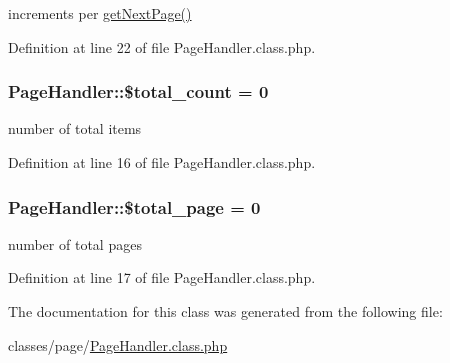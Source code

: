 increments per \hyperlink{classPageHandler_a259d01838d005d854d4cc263ba524de7}{get\+Next\+Page()} 



Definition at line 22 of file Page\+Handler.\+class.\+php.

\hypertarget{classPageHandler_ad0425a5e936db072a17956e4dada6f2b}{
\subsubsection[{\$total\+\_\+count}]{\setlength{\rightskip}{0pt plus 5cm}Page\+Handler\+::\$total\+\_\+count = 0}}\label{classPageHandler_ad0425a5e936db072a17956e4dada6f2b}


number of total items 



Definition at line 16 of file Page\+Handler.\+class.\+php.

\hypertarget{classPageHandler_adfb101b1d69a89c65cbe405e5d2be0ad}{
\subsubsection[{\$total\+\_\+page}]{\setlength{\rightskip}{0pt plus 5cm}Page\+Handler\+::\$total\+\_\+page = 0}}\label{classPageHandler_adfb101b1d69a89c65cbe405e5d2be0ad}


number of total pages 



Definition at line 17 of file Page\+Handler.\+class.\+php.



The documentation for this class was generated from the following file\+:\begin{DoxyCompactItemize}
\item 
classes/page/\hyperlink{PageHandler_8class_8php}{Page\+Handler.\+class.\+php}\end{DoxyCompactItemize}

